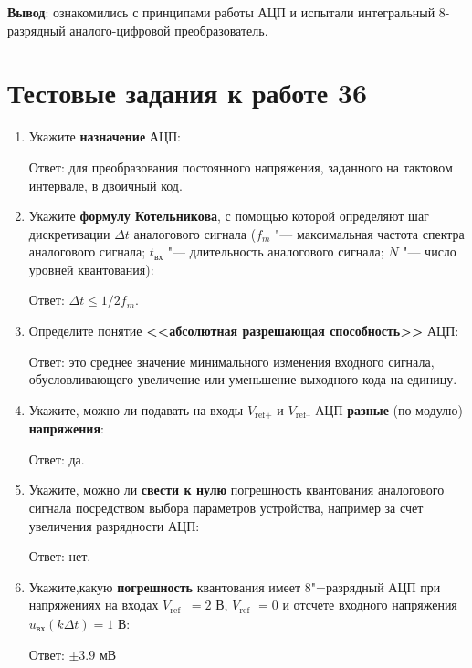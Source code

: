\documentclass[spec, och, labwork]{shiza}
\begin{document}
\textbf{Вывод}: ознакомились с принципами работы АЦП и испытали
интегральный 8-разрядный аналого-цифровой преобразователь.


\section*{Тестовые задания к работе 36}

\begin{enumerate}
    \item
        Укажите \textbf{назначение} АЦП:

        Ответ: для преобразования постоянного напряжения, заданного на тактовом
        интервале, в двоичный код.
    
    \item
        Укажите \textbf{формулу Котельникова}, с помощью которой
        определяют шаг дискретизации $\Delta t$ аналогового сигнала ($f_m$ "---
        максимальная частота спектра аналогового сигнала; $t_\text{вх}$ "---
        длительность аналогового сигнала; $N$ "--- число уровней квантования):

        Ответ: $\Delta t \leq 1/2 f_m$.
    
    \item
        Определите понятие \textbf{<<абсолютная разрешающая
        способность>>} АЦП:

        Ответ: это среднее значение минимального изменения входного сигнала,
        обусловливающего увеличение или уменьшение выходного кода на единицу.

    \item
        Укажите, можно ли подавать на входы $V_\text{ref+}$ и
        $V_\text{ref–}$ АЦП \textbf{разные} (по модулю) \textbf{напряжения}:

        Ответ: да.
    
    \item
        Укажите, можно ли \textbf{свести к нулю} погрешность квантования
        аналогового сигнала посредством выбора параметров устройства, например
        за счет увеличения разрядности АЦП:
    
        Ответ: нет.

    \item
        Укажите,какую \textbf{погрешность} квантования имеет
        8"=разрядный АЦП при напряжениях на входах $V_\text{ref+} = 2$ В,
        $V_\text{ref–} = 0$ и отсчете входного напряжения $u_\text{вх}(k \Delta
        t) = 1$ В:

        Ответ: $\pm 3.9$ мВ


\end{enumerate}
\end{document}
